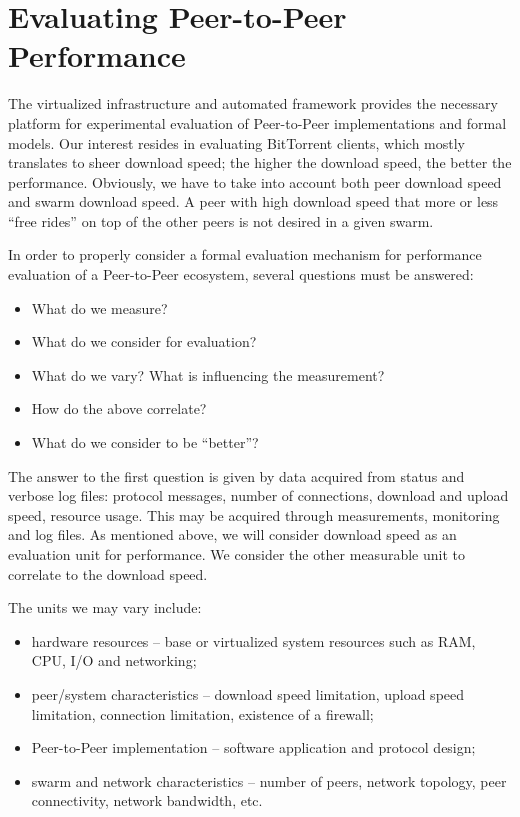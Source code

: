 \section{Evaluating Peer-to-Peer Performance}
\label{sec:eval-swarm}

The virtualized infrastructure and automated framework provides the necessary
platform for experimental evaluation of Peer-to-Peer implementations and
formal models. Our interest resides in evaluating BitTorrent clients, which
mostly translates to sheer download speed; the higher the download speed, the
better the performance. Obviously, we have to take into account both peer
download speed and swarm download speed. A peer with high download speed that
more or less ``free rides'' on top of the other peers is not desired in a
given swarm.

In order to properly consider a formal evaluation mechanism for performance
evaluation of a Peer-to-Peer ecosystem, several questions must be answered:

\begin{itemize}
  \item What do we measure?
  \item What do we consider for evaluation?
  \item What do we vary? What is influencing the measurement?
  \item How do the above correlate?
  \item What do we consider to be ``better''?
\end{itemize}

The answer to the first question is given by data acquired from status and
verbose log files: protocol messages, number of connections, download and
upload speed, resource usage. This may be acquired through measurements,
monitoring and log files. As mentioned above, we will consider download speed
as an evaluation unit for performance. We consider the other measurable unit
to correlate to the download speed.

The units we may vary include:

\begin{itemize}
  \item hardware resources -- base or virtualized system resources such as
  RAM, CPU, I/O and networking;
  \item peer/system characteristics -- download speed limitation, upload speed
  limitation, connection limitation, existence of a firewall;
  \item Peer-to-Peer implementation -- software application and protocol
  design;
  \item swarm and network characteristics -- number of peers, network
  topology, peer connectivity, network bandwidth, etc.
\end{itemize}

